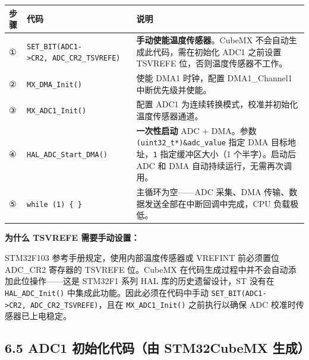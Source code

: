 \documentclass[
  chinese,
  UTF8,
  oneside,
  openany]{ctexbook}
\begin{document}
\begin{longtable}[]{@{}
  >{\raggedright\arraybackslash}p{}
  >{\raggedright\arraybackslash}p{}
  >{\raggedright\arraybackslash}p{}@{}}
\toprule\noalign{}
\begin{minipage}[b]{\linewidth}\raggedright
步骤
\end{minipage} & \begin{minipage}[b]{\linewidth}\raggedright
代码
\end{minipage} & \begin{minipage}[b]{\linewidth}\raggedright
说明
\end{minipage} \\
\midrule\noalign{}
\endhead
\bottomrule\noalign{}
\endlastfoot
① & \texttt{SET\_BIT(ADC1-\textgreater{}CR2,\ ADC\_CR2\_TSVREFE)} &
\textbf{手动使能温度传感器}。CubeMX 不会自动生成此代码，需在初始化 ADC1
之前设置 TSVREFE 位，否则温度传感器不工作。 \\
② & \texttt{MX\_DMA\_Init()} & 使能 DMA1 时钟，配置 DMA1\_Channel1
中断优先级并使能。 \\
③ & \texttt{MX\_ADC1\_Init()} & 配置 ADC1
为连续转换模式，校准并初始化温度传感器通道。 \\
④ & \texttt{HAL\_ADC\_Start\_DMA()} & \textbf{一次性启动} ADC +
DMA。参数 \texttt{(uint32\_t*)\&adc\_value} 指定 DMA
目标地址，\texttt{1} 指定缓冲区大小（1 个半字）。启动后 ADC 和 DMA
自动持续运行，无需再次调用。 \\
⑤ & \texttt{while\ (1)\ \{\ \}} & 主循环为空------ADC 采集、DMA
传输、数据发送全部在中断回调中完成，CPU 负载极低。 \\
\end{longtable}

\textbf{为什么 TSVREFE 需要手动设置：}

STM32F103 参考手册规定，使用内部温度传感器或 VREFINT 前必须置位 ADC\_CR2
寄存器的 TSVREFE 位。CubeMX
在代码生成过程中并不会自动添加此位操作------这是 STM32F1 系列 HAL
库的历史遗留设计，ST 没有在 \texttt{HAL\_ADC\_Init()}
中集成此功能。因此必须在代码中手动
\texttt{SET\_BIT(ADC1-\textgreater{}CR2,\ ADC\_CR2\_TSVREFE)}，且在
\texttt{MX\_ADC1\_Init()} 之前执行以确保 ADC 校准时传感器已上电稳定。

\subsection{6.5 ADC1 初始化代码（由 STM32CubeMX
生成）}\label{adc1-ux521dux59cbux5316ux4ee3ux7801ux7531-stm32cubemx-ux751fux6210-1}
\end{document}
